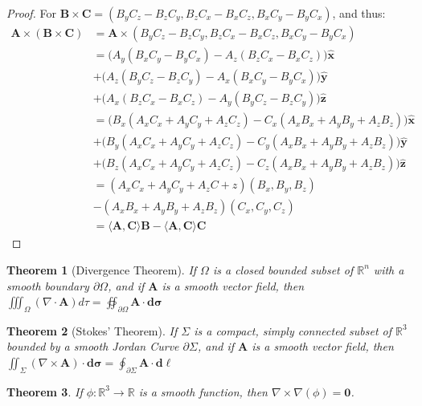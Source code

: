 \documentclass[oneside]{book}
\theoremstyle{mystyle}
\newtheorem{theorem}{Theorem}[section]
\begin{document}
\begin{proof}
For $\mathbf{B}\times \mathbf{C} = (B_{y}C_{z} - B_{z}C_{y},B_{z}C_{x}-B_{x}C_{z},B_{x}C_{y} - B_{y}C_{x})$, and thus:
\begin{align*}
    \mathbf{A}\times(\mathbf{B}\times \mathbf{C}) &= \mathbf{A}\times(B_{y}C_{z} - B_{z}C_{y},B_{z}C_{x}-B_{x}C_{z},B_{x}C_{y} - B_{y}C_{x})\\
    &= \big(A_{y}(B_{x}C_{y} - B_{y}C_{x}) - A_{z}(B_{z}C_{x}-B_{x}C_{z})\big)\hat{\mathbf{x}}\\
    &+ \big(A_{z}(B_{y}C_{z} - B_{z}C_{y}) - A_{x}(B_{x}C_{y}-B_{y}C_{x})\big)\hat{\mathbf{y}}\\
    &+ \big(A_{x}(B_{z}C_{x} - B_{x}C_{z}) - A_{y}(B_{y}C_{z}-B_{z}C_{y})\big)\hat{\mathbf{z}}\\
    &= \big(B_{x}(A_{x}C_{x}+A_{y}C_{y}+A_{z}C_{z})-C_{x}(A_{x}B_{x}+A_{y}B_{y}+A_{z}B_{z})\big)\hat{\mathbf{x}}\\
    &+ \big(B_{y}(A_{x}C_{x}+A_{y}C_{y}+A_{z}C_{z})-C_{y}(A_{x}B_{x}+A_{y}B_{y}+A_{z}B_{z})\big)\hat{\mathbf{y}}\\
    &+ \big(B_{z}(A_{x}C_{x}+A_{y}C_{y}+A_{z}C_{z})-C_{z}(A_{x}B_{x}+A_{y}B_{y}+A_{z}B_{z})\big)\hat{\mathbf{z}}\\
    &= (A_{x}C_{x}+A_{y}C_{y}+A_{z}C+{z})(B_{x},B_{y},B_{z})\\
    &- (A_{x}B_{x}+A_{y}B_{y}+A_{z}B_{z})(C_{x},C_{y},C_{z})\\
    &= \langle \mathbf{A},\mathbf{C}\rangle \mathbf{B} - \langle \mathbf{A},\mathbf{C}\rangle \mathbf{C}
\end{align*}
\end{proof}
\begin{theorem}[Divergence Theorem]
If $\Omega$ is a closed bounded subset of $\mathbb{R}^{n}$ with a smooth boundary $\partial \Omega$, and if $\mathbf{A}$ is a smooth vector field, then $\iiint_{\Omega} (\nabla \cdot \mathbf{A})d\tau = \oiint_{\partial \Omega}\mathbf{A}\cdot \boldsymbol{d\sigma}$ 
\end{theorem}
\begin{theorem}[Stokes' Theorem]
If $\Sigma$ is a compact, simply connected subset of $\mathbb{R}^{3}$ bounded by a smooth Jordan Curve $\partial \Sigma$, and if $\mathbf{A}$ is a smooth vector field, then $\iint_{\Sigma}(\nabla\times \mathbf{A})\cdot \boldsymbol{d\sigma} = \oint_{\partial \Sigma}\mathbf{A}\cdot \boldsymbol{d\ell}$
\end{theorem}
\begin{theorem}
If $\phi:\mathbb{R}^{3}\rightarrow \mathbb{R}$ is a smooth function, then $\nabla \times \nabla(\phi) = \boldsymbol{0}$.
\end{theorem}
\end{document}
